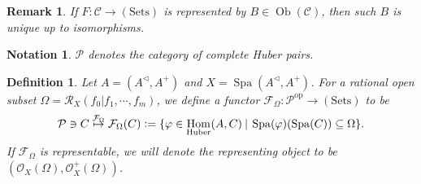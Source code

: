 \documentclass[8pt]{article}
\numberwithin{equation}{section}
\newtheorem{definition}{Definition}[subsection]
\newtheorem{notation}{Notation}[subsection]
\newtheorem{remark}{Remark}[subsection]
\DeclareMathOperator{\Hom}{Hom}
\DeclareMathOperator{\Ob}{Ob}
\DeclareMathOperator{\Spa}{Spa}
\newcommand{\defeq}{\vcentcolon=}
\newcommand{\cR}[0]{\mathcal{R}}
\newcommand{\sep}[0]{\:|\:}
\newcommand{\sC}[0]{\mathscr{C}}
\newcommand{\cO}[0]{\mathcal{O}}
\newcommand{\cF}[0]{\mathcal{F}}
\begin{document}
\begin{remark}
    If $F:\sC\to (\mathrm{Sets})$ is represented by $B\in\Ob(\sC)$, then such $B$ is unique up to isomorphisms.
\end{remark}

\begin{notation}
    $\mathcal{P}$ denotes the category of complete Huber pairs.
\end{notation}
\begin{definition}
    Let $A=(A^\triangleleft,A^+)$ and $X=\Spa(A^\triangleleft,A^+)$. For a rational open subset $\Omega = \cR_X(f_0|f_1,\cdots,f_m)$, we define a functor $\cF_\Omega:\mathcal{P}^{\mathrm{op}}\to(\mathrm{Sets})$ to be
    \begin{equation*}
        \mathcal{P}\ni C\stackrel{\cF_\Omega}{\mapsto}\cF_\Omega(C) \defeq\{\varphi\in\Hom_{\mathrm{Huber}}(A,C)\sep \Spa(\varphi)(\Spa(C))\subseteq\Omega\}.
    \end{equation*}
    If $\cF_\Omega$ is representable, we will denote the representing object to be $(\cO_X(\Omega),\cO_X^+(\Omega))$.
\end{definition}
\end{document}
